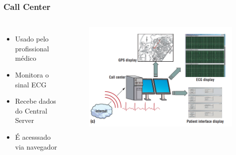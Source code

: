 \documentclass{beamer}
\begin{document}


\begin{frame}
\frametitle{Call Center}

\begin{columns}[c] %

	\begin{itemize}
		\item Usado pelo profissional médico
		\item Monitora o sinal ECG
		\item Recebe dados do Central Server
		\item É acesssado via navegador
	\end{itemize}

	\begin{figure}
		\includegraphics[width=1\linewidth]{figura3-call-center.png}
	\end{figure}

\end{columns}

\end{frame}
\end{document}
